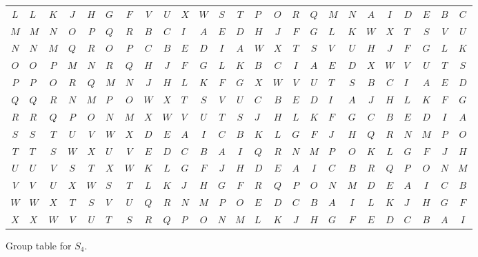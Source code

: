 \documentclass[../gatm_answers.tex]{subfiles}
\begin{document}
\begin{figure}
\begin{center}
\begin{tabular}{c|acccacccacccacccacccaccc}
			$L$ & $L$ & $K$ & $J$ & $H$ & $G$ & $F$ & $V$ & $U$ & $X$ & $W$ & $S$ & $T$ & $P$ & $O$ & $R$ & $Q$ & $M$ & $N$ & $A$ & $I$ & $D$ & $E$ & $B$ & $C$ \\
			$M$ & $M$ & $N$ & $O$ & $P$ & $Q$ & $R$ & $B$ & $C$ & $I$ & $A$ & $E$ & $D$ & $H$ & $J$ & $F$ & $G$ & $L$ & $K$ & $W$ & $X$ & $T$ & $S$ & $V$ & $U$ \\
			$N$ & $N$ & $M$ & $Q$ & $R$ & $O$ & $P$ & $C$ & $B$ & $E$ & $D$ & $I$ & $A$ & $W$ & $X$ & $T$ & $S$ & $V$ & $U$ & $H$ & $J$ & $F$ & $G$ & $L$ & $K$ \\
			$O$ & $O$ & $P$ & $M$ & $N$ & $R$ & $Q$ & $H$ & $J$ & $F$ & $G$ & $L$ & $K$ & $B$ & $C$ & $I$ & $A$ & $E$ & $D$ & $X$ & $W$ & $V$ & $U$ & $T$ & $S$ \\
			$P$ & $P$ & $O$ & $R$ & $Q$ & $M$ & $N$ & $J$ & $H$ & $L$ & $K$ & $F$ & $G$ & $X$ & $W$ & $V$ & $U$ & $T$ & $S$ & $B$ & $C$ & $I$ & $A$ & $E$ & $D$ \\
			$Q$ & $Q$ & $R$ & $N$ & $M$ & $P$ & $O$ & $W$ & $X$ & $T$ & $S$ & $V$ & $U$ & $C$ & $B$ & $E$ & $D$ & $I$ & $A$ & $J$ & $H$ & $L$ & $K$ & $F$ & $G$ \\
			$R$ & $R$ & $Q$ & $P$ & $O$ & $N$ & $M$ & $X$ & $W$ & $V$ & $U$ & $T$ & $S$ & $J$ & $H$ & $L$ & $K$ & $F$ & $G$ & $C$ & $B$ & $E$ & $D$ & $I$ & $A$ \\
			$S$ & $S$ & $T$ & $U$ & $V$ & $W$ & $X$ & $D$ & $E$ & $A$ & $I$ & $C$ & $B$ & $K$ & $L$ & $G$ & $F$ & $J$ & $H$ & $Q$ & $R$ & $N$ & $M$ & $P$ & $O$ \\
			$T$ & $T$ & $S$ & $W$ & $X$ & $U$ & $V$ & $E$ & $D$ & $C$ & $B$ & $A$ & $I$ & $Q$ & $R$ & $N$ & $M$ & $P$ & $O$ & $K$ & $L$ & $G$ & $F$ & $J$ & $H$ \\
			$U$ & $U$ & $V$ & $S$ & $T$ & $X$ & $W$ & $K$ & $L$ & $G$ & $F$ & $J$ & $H$ & $D$ & $E$ & $A$ & $I$ & $C$ & $B$ & $R$ & $Q$ & $P$ & $O$ & $N$ & $M$ \\
			$V$ & $V$ & $U$ & $X$ & $W$ & $S$ & $T$ & $L$ & $K$ & $J$ & $H$ & $G$ & $F$ & $R$ & $Q$ & $P$ & $O$ & $N$ & $M$ & $D$ & $E$ & $A$ & $I$ & $C$ & $B$ \\
			$W$ & $W$ & $X$ & $T$ & $S$ & $V$ & $U$ & $Q$ & $R$ & $N$ & $M$ & $P$ & $O$ & $E$ & $D$ & $C$ & $B$ & $A$ & $I$ & $L$ & $K$ & $J$ & $H$ & $G$ & $F$ \\
			$X$ & $X$ & $W$ & $V$ & $U$ & $T$ & $S$ & $R$ & $Q$ & $P$ & $O$ & $N$ & $M$ & $L$ & $K$ & $J$ & $H$ & $G$ & $F$ & $E$ & $D$ & $C$ & $B$ & $A$ & $I$ \\ \hline
		\end{tabular}
	\end{center}
\caption{Group table for $S_4$.}
\label{fig:four_post_snap_table}
\end{figure}
\end{document}
